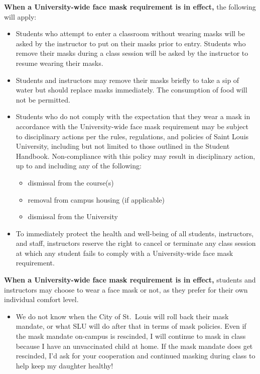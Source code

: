 \documentclass[
]{book}
\providecommand{\tightlist}{%
  \setlength{\itemsep}{0pt}\setlength{\parskip}{0pt}}
\newenvironment{rmdblock}[1]
  {\begin{shaded*}
  \begin{itemize}
  \renewcommand{\labelitemi}{
    \raisebox{-.7\height}[0pt][0pt]{
      {\setkeys{Gin}{width=3em,keepaspectratio}\texttt{[image: images/\#1]}}
    }
  }
  \item
  }
  {
  \end{itemize}
  \end{shaded*}
  }
\newenvironment{rmdwarning}
  {\begin{rmdblock}{warning}}
  {\end{rmdblock}}
\begin{document}
\textbf{When a University-wide face mask requirement is in effect,} the following will apply:

\begin{itemize}
\tightlist
\item
  Students who attempt to enter a classroom without wearing masks will be asked by the instructor to put on their masks prior to entry. Students who remove their masks during a class session will be asked by the instructor to resume wearing their masks.
\item
  Students and instructors may remove their masks briefly to take a sip of water but should replace masks immediately. The consumption of food will not be permitted.
\item
  Students who do not comply with the expectation that they wear a mask in accordance with the University-wide face mask requirement may be subject to disciplinary actions per the rules, regulations, and policies of Saint Louis University, including but not limited to those outlined in the Student Handbook. Non-compliance with this policy may result in disciplinary action, up to and including any of the following:

  \begin{itemize}
  \tightlist
  \item
    dismissal from the course(s)
  \item
    removal from campus housing (if applicable)
  \item
    dismissal from the University
  \end{itemize}
\item
  To immediately protect the health and well-being of all students, instructors, and staff, instructors reserve the right to cancel or terminate any class session at which any student fails to comply with a University-wide face mask requirement.
\end{itemize}

\textbf{When a University-wide face mask requirement is in effect,} students and instructors may choose to wear a face mask or not, as they prefer for their own individual comfort level.

\begin{rmdwarning}
We do not know when the City of St.~Louis will roll back their mask
mandate, or what SLU will do after that in terms of mask policies. Even
if the mask mandate on-campus is rescinded, I will continue to mask in
class because I have an unvaccinated child at home. If the mask mandate
does get rescinded, I'd ask for your cooperation and continued masking
during class to help keep my daughter healthy!
\end{rmdwarning}
\end{document}

